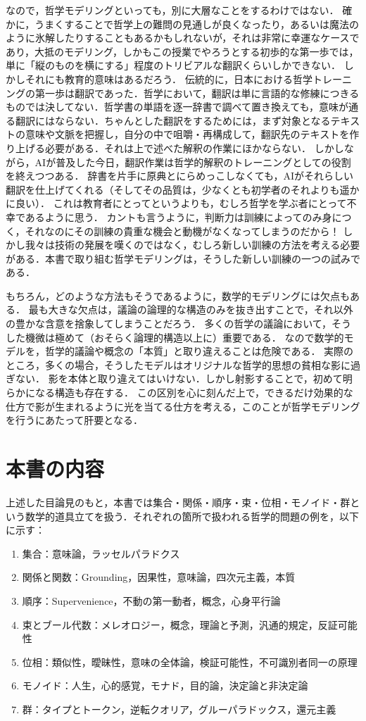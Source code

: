 \documentclass[11pt,a4paper]{jsarticle}
\begin{document}
なので，哲学モデリングといっても，別に大層なことをするわけではない．
確かに，うまくすることで哲学上の難問の見通しが良くなったり，あるいは魔法のように氷解したりすることもあるかもしれないが，それは非常に幸運なケースであり，大抵のモデリング，しかもこの授業でやろうとする初歩的な第一歩では，単に「縦のものを横にする」程度のトリビアルな翻訳くらいしかできない．
しかしそれにも教育的意味はあるだろう．
伝統的に，日本における哲学トレーニングの第一歩は翻訳であった．哲学において，翻訳は単に言語的な修練につきるものでは決してない．哲学書の単語を逐一辞書で調べて置き換えても，意味が通る翻訳にはならない．ちゃんとした翻訳をするためには，まず対象となるテキストの意味や文脈を把握し，自分の中で咀嚼・再構成して，翻訳先のテキストを作り上げる必要がある．それは上で述べた解釈の作業にほかならない．
しかしながら，AIが普及した今日，翻訳作業は哲学的解釈のトレーニングとしての役割を終えつつある．
辞書を片手に原典とにらめっこしなくても，AIがそれらしい翻訳を仕上げてくれる（そしてその品質は，少なくとも初学者のそれよりも遥かに良い）．
これは教育者にとってというよりも，むしろ哲学を学ぶ者にとって不幸であるように思う．
カントも言うように，判断力は訓練によってのみ身につく，それなのにその訓練の貴重な機会と動機がなくなってしまうのだから！
しかし我々は技術の発展を嘆くのではなく，むしろ新しい訓練の方法を考える必要がある．本書で取り組む哲学モデリングは，そうした新しい訓練の一つの試みである．

もちろん，どのような方法もそうであるように，数学的モデリングには欠点もある．
最も大きな欠点は，議論の論理的な構造のみを抜き出すことで，それ以外の豊かな含意を捨象してしまうことだろう．
多くの哲学の議論において，そうした機微は極めて（おそらく論理的構造以上に）重要である．
なので数学的モデルを，哲学的議論や概念の「本質」と取り違えることは危険である．
実際のところ，多くの場合，そうしたモデルはオリジナルな哲学的思想の貧相な影に過ぎない．
影を本体と取り違えてはいけない．しかし射影することで，初めて明らかになる構造も存在する．
この区別を心に刻んだ上で，できるだけ効果的な仕方で影が生まれるように光を当てる仕方を考える，このことが哲学モデリングを行うにあたって肝要となる．


\section{本書の内容}
上述した目論見のもと，本書では集合・関係・順序・束・位相・モノイド・群という数学的道具立てを扱う．それぞれの箇所で扱われる哲学的問題の例を，以下に示す：
\begin{enumerate}
    \item 集合：意味論，ラッセルパラドクス
    \item 関係と関数：Grounding，因果性，意味論，四次元主義，本質
    \item 順序：Supervenience，不動の第一動者，概念，心身平行論
    \item 束とブール代数：メレオロジー，概念，理論と予測，汎通的規定，反証可能性
    \item 位相：類似性，曖昧性，意味の全体論，検証可能性，不可識別者同一の原理
    \item モノイド：人生，心的感覚，モナド，目的論，決定論と非決定論
    \item 群：タイプとトークン，逆転クオリア，グルーパラドックス，還元主義
\end{enumerate}
\end{document}

